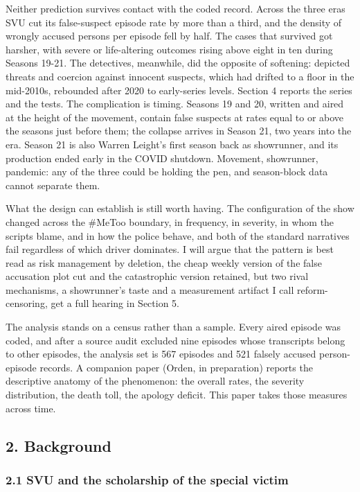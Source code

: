 \documentclass[
]{article}
\begin{document}
Neither prediction survives contact with the coded record. Across the
three eras SVU cut its false-suspect episode rate by more than a third,
and the density of wrongly accused persons per episode fell by half. The
cases that survived got harsher, with severe or life-altering outcomes
rising above eight in ten during Seasons 19-21. The detectives,
meanwhile, did the opposite of softening: depicted threats and coercion
against innocent suspects, which had drifted to a floor in the
mid-2010s, rebounded after 2020 to early-series levels. Section 4
reports the series and the tests. The complication is timing. Seasons 19
and 20, written and aired at the height of the movement, contain false
suspects at rates equal to or above the seasons just before them; the
collapse arrives in Season 21, two years into the era. Season 21 is also
Warren Leight's first season back as showrunner, and its production
ended early in the COVID shutdown. Movement, showrunner, pandemic: any
of the three could be holding the pen, and season-block data cannot
separate them.

What the design can establish is still worth having. The configuration
of the show changed across the \#MeToo boundary, in frequency, in
severity, in whom the scripts blame, and in how the police behave, and
both of the standard narratives fail regardless of which driver
dominates. I will argue that the pattern is best read as risk management
by deletion, the cheap weekly version of the false accusation plot cut
and the catastrophic version retained, but two rival mechanisms, a
showrunner's taste and a measurement artifact I call reform-censoring,
get a full hearing in Section 5.

The analysis stands on a census rather than a sample. Every aired
episode was coded, and after a source audit excluded nine episodes whose
transcripts belong to other episodes, the analysis set is 567 episodes
and 521 falsely accused person-episode records. A companion paper
(Orden, in preparation) reports the descriptive anatomy of the
phenomenon: the overall rates, the severity distribution, the death
toll, the apology deficit. This paper takes those measures across time.

\subsection{2. Background}\label{background}

\subsubsection{2.1 SVU and the scholarship of the special
victim}\label{svu-and-the-scholarship-of-the-special-victim}
\end{document}
